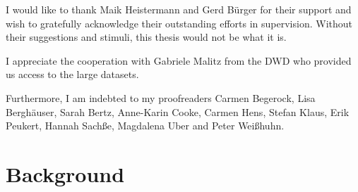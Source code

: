 \documentclass[a4paper]{article}
\begin{document}
\begin{multicols}{2}
I would like to thank Maik Heistermann and Gerd Bürger for their support and wish to gratefully acknowledge their outstanding efforts in supervision. Without their suggestions and stimuli, this thesis would not be what it is.

I appreciate the cooperation with Gabriele Malitz from the DWD who provided us access to the large datasets.

Furthermore, I am indebted to my proofreaders Carmen Begerock, Lisa Berghäuser, Sarah Bertz, Anne-Karin Cooke, Carmen Hens, Stefan Klaus, Erik Peukert, Hannah Sachße, Magdalena Uber and Peter Weißhuhn.

\end{multicols}


\pagebreak

\section{Background} %
\label{sec:background}
\end{document}

